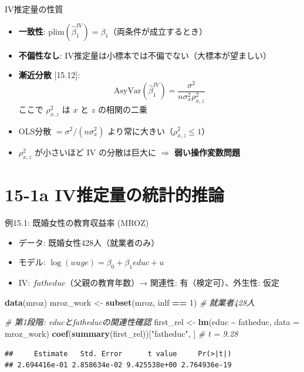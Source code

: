 \documentclass[
  ignorenonframetext,
]{beamer}
\newenvironment{Shaded}{\begin{snugshade}}{\end{snugshade}}
\newcommand{\AttributeTok}[1]{\textcolor[rgb]{0.13,0.29,0.53}{#1}}
\newcommand{\CommentTok}[1]{\textcolor[rgb]{0.56,0.35,0.01}{\textit{#1}}}
\newcommand{\DecValTok}[1]{\textcolor[rgb]{0.00,0.00,0.81}{#1}}
\newcommand{\FunctionTok}[1]{\textcolor[rgb]{0.13,0.29,0.53}{\textbf{#1}}}
\newcommand{\NormalTok}[1]{#1}
\newcommand{\OtherTok}[1]{\textcolor[rgb]{0.56,0.35,0.01}{#1}}
\newcommand{\SpecialCharTok}[1]{\textcolor[rgb]{0.81,0.36,0.00}{\textbf{#1}}}
\newcommand{\StringTok}[1]{\textcolor[rgb]{0.31,0.60,0.02}{#1}}
\providecommand{\tightlist}{%
  \setlength{\itemsep}{0pt}\setlength{\parskip}{0pt}}
\begin{document}
\begin{frame}{IV推定量の性質}
\label{ivux63a8ux5b9aux91cfux306eux6027ux8cea}
\begin{itemize}
\tightlist
\item
  \textbf{一致性}:
  \(\text{plim}(\hat{\beta}_1^{IV}) = \beta_1\)（両条件が成立するとき）
\item
  \textbf{不偏性なし}:
  IV推定量は小標本では不偏でない（大標本が望ましい）
\item
  \textbf{漸近分散} {[}15.12{]}:
  \[\text{AsyVar}(\hat{\beta}_1^{IV}) = \frac{\sigma^2}{n \sigma_x^2 \rho_{x,z}^2}\]
  ここで \(\rho_{x,z}^2\) は \(x\) と \(z\) の相関の二乗
\item
  OLS分散 \(= \sigma^2 / (n\sigma_x^2)\)
  より常に大きい（\(\rho_{x,z}^2 \leq 1\)）
\item
  \(\rho_{x,z}^2\) が小さいほど IV の分散は巨大に \(\Rightarrow\)
  \textbf{弱い操作変数問題}
\end{itemize}
\end{frame}

\section{15-1a
IV推定量の統計的推論}\label{a-ivux63a8ux5b9aux91cfux306eux7d71ux8a08ux7684ux63a8ux8ad6}

\begin{frame}[fragile]{例15.1: 既婚女性の教育収益率 (MROZ)}
\label{ux4f8b15.1-ux65e2ux5a5aux5973ux6027ux306eux6559ux80b2ux53ceux76caux7387-mroz}
\begin{itemize}
\tightlist
\item
  データ: 既婚女性428人（就業者のみ）
\item
  モデル: \(\log(wage) = \beta_0 + \beta_1 educ + u\)
\item
  IV: \(fatheduc\)（父親の教育年数）→ 関連性: 有（検定可）、外生性: 仮定
\end{itemize}

\footnotesize

\begin{Shaded}
\begin{Highlighting}[]
\FunctionTok{data}\NormalTok{(mroz)}
\NormalTok{mroz\_work }\OtherTok{\textless{}{-}} \FunctionTok{subset}\NormalTok{(mroz, inlf }\SpecialCharTok{==} \DecValTok{1}\NormalTok{)  }\CommentTok{\# 就業者428人}

\CommentTok{\# 第1段階: educとfatheducの関連性確認}
\NormalTok{first\_rel }\OtherTok{\textless{}{-}} \FunctionTok{lm}\NormalTok{(educ }\SpecialCharTok{\textasciitilde{}}\NormalTok{ fatheduc, }\AttributeTok{data =}\NormalTok{ mroz\_work)}
\FunctionTok{coef}\NormalTok{(}\FunctionTok{summary}\NormalTok{(first\_rel))[}\StringTok{"fatheduc"}\NormalTok{, ]  }\CommentTok{\# t = 9.28}
\end{Highlighting}
\end{Shaded}

\begin{verbatim}
##     Estimate   Std. Error      t value     Pr(>|t|) 
## 2.694416e-01 2.858634e-02 9.425538e+00 2.764936e-19
\end{verbatim}

\normalsize
\end{frame}
\end{document}
